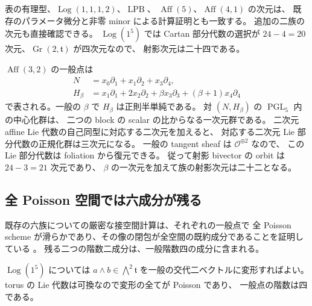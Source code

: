 表の有理型、$\operatorname{Log}(1,1,1,2)$、$\operatorname{LPB}$、
$\operatorname{Aff}(5)$、$\operatorname{Aff}(4,1)$ の次元は、
既存のパラメータ微分と非零 minor による計算証明とも一致する。
追加の二族の次元も直接確認できる。
$\operatorname{Log}(1^5)$ では Cartan 部分代数の選択が
$24-4=20$ 次元、$\operatorname{Gr}(2,\mathfrak t)$ が四次元なので、
射影次元は二十四である。

$\operatorname{Aff}(3,2)$ の一般点は
\begin{align*}
 N&=x_0\partial_1+x_1\partial_2+x_3\partial_4,\\
 H_\beta&=x_1\partial_1+2x_2\partial_2+
              \beta x_3\partial_3+(\beta+1)x_4\partial_4
\end{align*}
で表される。一般の $\beta$ で $H_\beta$ は正則半単純である。
対 $(N,H_\beta)$ の $\operatorname{PGL}_5$ 内の中心化群は、
二つの block の scalar の比からなる一次元群である。
二次元 affine Lie 代数の自己同型に対応する二次元を加えると、
対応する二次元 Lie 部分代数の正規化群は三次元になる。
一般の tangent sheaf は $\mathcal O^{\oplus2}$ なので、
この Lie 部分代数は foliation から復元できる。
従って射影 bivector の orbit は $24-3=21$ 次元であり、
$\beta$ の一次元を加えて族の射影次元は二十二となる。

\subsection{全 Poisson 空間では六成分が残る}

既存の六族についての厳密な接空間計算は、それぞれの一般点で
全 Poisson scheme が滑らかであり、その像の閉包が全空間の既約成分であることを証明している
\cite{v13}。
残る二つの階数二成分は、一般階数四の成分に含まれる。

$\operatorname{Log}(1^5)$ については
$a\wedge b\in\bigwedge^2\mathfrak t$ を一般の交代二ベクトルに変形すればよい。
torus の Lie 代数は可換なので変形の全てが Poisson であり、
一般点の階数は四である。

